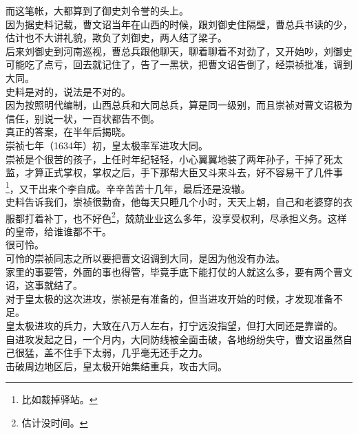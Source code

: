 \begin{multicols}{\theparacolNo}
而这笔帐，大都算到了御史刘令誉的头上。\\

因为据史料记载，曹文诏当年在山西的时候，跟刘御史住隔壁，曹总兵书读的少，估计也不大讲礼貌，欺负了刘御史，两人结了梁子。\\

后来刘御史到河南巡视，曹总兵跟他聊天，聊着聊着不对劲了，又开始吵，刘御史可能吃了点亏，回去就记住了，告了一黑状，把曹文诏告倒了，经崇祯批准，调到大同。\\

史料是对的，说法是不对的。\\

因为按照明代编制，山西总兵和大同总兵，算是同一级别，而且崇祯对曹文诏极为信任，别说一状，一百状都告不倒。\\

真正的答案，在半年后揭晓。\\

崇祯七年（1634年）初，皇太极率军进攻大同。\\

崇祯是个很苦的孩子，上任时年纪轻轻，小心翼翼地装了两年孙子，干掉了死太监，才算正式掌权，掌权之后，手下那帮大臣又斗来斗去，好不容易干了几件事\footnote{比如裁掉驿站。}，又干出来个李自成。辛辛苦苦十几年，最后还是没辙。\\

史料告诉我们，崇祯很勤奋，他每天只睡几个小时，天天上朝，自己和老婆穿的衣服都打着补丁，也不好色\footnote{估计没时间。}，兢兢业业这么多年，没享受权利，尽承担义务。这样的皇帝，给谁谁都不干。\\

很可怜。\\

可怜的崇祯同志之所以要把曹文诏调到大同，是因为他没有办法。\\

家里的事要管，外面的事也得管，毕竟手底下能打仗的人就这么多，要有两个曹文诏，这事就结了。\\

对于皇太极的这次进攻，崇祯是有准备的，但当进攻开始的时候，才发现准备不足。\\

皇太极进攻的兵力，大致在八万人左右，打宁远没指望，但打大同还是靠谱的。\\

自进攻发起之日，一个月内，大同防线被全面击破，各地纷纷失守，曹文诏虽然自己很猛，盖不住手下太弱，几乎毫无还手之力。\\

击破周边地区后，皇太极开始集结重兵，攻击大同。\\


\end{multicols}

